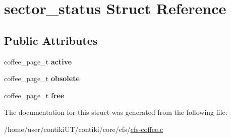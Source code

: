 \hypertarget{structsector__status}{}\section{sector\+\_\+status Struct Reference}
\label{structsector__status}
\subsection*{Public Attributes}
\begin{DoxyCompactItemize}
\item 
\hypertarget{structsector__status_a90892025e67b6ad98296aa5fab8185e1}{}coffee\+\_\+page\+\_\+t {\bfseries active}\label{structsector__status_a90892025e67b6ad98296aa5fab8185e1}

\item 
\hypertarget{structsector__status_a80333938188b3c0e94e72ca8a44e2a91}{}coffee\+\_\+page\+\_\+t {\bfseries obsolete}\label{structsector__status_a80333938188b3c0e94e72ca8a44e2a91}

\item 
\hypertarget{structsector__status_a810ab3287b2fdca783c31bac464946f6}{}coffee\+\_\+page\+\_\+t {\bfseries free}\label{structsector__status_a810ab3287b2fdca783c31bac464946f6}

\end{DoxyCompactItemize}


The documentation for this struct was generated from the following file\+:\begin{DoxyCompactItemize}
\item 
/home/user/contiki\+U\+T/contiki/core/cfs/\hyperlink{cfs-coffee_8c}{cfs-\/coffee.\+c}\end{DoxyCompactItemize}
